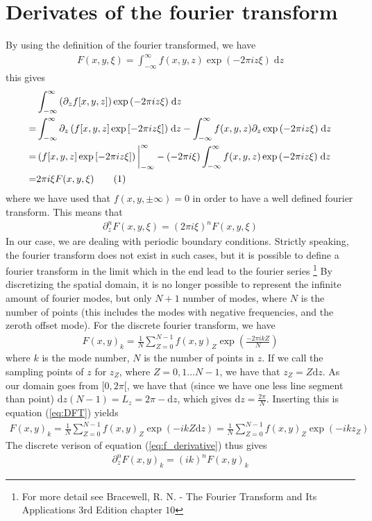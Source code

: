 \documentclass[12pt]{article}
\newcommand{\defi}[4]{\int_{#1}^{#2} {#3} \; \text{d} {#4}} %
\def\L{\left}
\def\R{\right}
\newcommand\numberthis{\addtocounter{equation}{1}\tag{\theequation}}
\begin{document}
\section{Derivates of the fourier transform}
\label{sec:deriv_of_FT}
By using the definition of the fourier transformed, we have
%
\begin{align*}
    F(x,y,\xi) = \defi{-\infty}{\infty}{f(x,y,z)\exp\L(-2\pi iz\xi\R)}{z}
\end{align*}
%
this gives
%
\begin{align*}
    &\defi{-\infty}{\infty}{\L(\partial_zf[x,y,z]\R)\exp\L(-2\pi iz\xi\R)}{z}\\
%
    =& \defi{-\infty}{\infty}{\partial_z\L(f[x,y,z]\exp\L[-2\pi iz\xi\R]\R)}{z}
     - \defi{-\infty}{\infty}{f(x,y,z)\partial_z\exp\L(-2\pi iz\xi\R)}{z}\\
%
    =& \L(f[x,y,z]\exp\L[-2\pi iz\xi\R]\R)\bigg|_{-\infty}^{\infty}
     - \L(-2\pi i\xi\R)\defi{-\infty}{\infty}{f(x,y,z)\exp\L(-2\pi iz\xi\R)}{z}\\
%
    =& 2\pi i\xi F(x,y,\xi)
    \numberthis
    \label{eq:f_derivative}
\end{align*}
%
where we have used that $f(x,y,\pm\infty)=0$ in order to have a well defined
fourier transform. This means that
%
\begin{align*}
    \partial_z^n F(x,y,\xi) = (2\pi i \xi)^n F(x,y,\xi)
\end{align*}
%
In our case, we are dealing with periodic boundary conditions. Strictly
speaking, the fourier transform does not exist in such cases, but it is
possible to define a fourier transform in the limit which in the end lead to
the fourier series%
\footnote{For more detail see Bracewell, R. N. - The Fourier Transform and Its
Applications 3rd Edition chapter $10$}%
%
By discretizing the spatial domain, it is no longer possible to represent the
infinite amount of fourier modes, but only $N+1$ number of modes, where $N$ is
the number of points (this includes the modes with negative frequencies, and
the zeroth offset mode). For the discrete fourier transform, we have
%
\begin{align}
    F(x,y)_{k} =
    \frac{1}{N}\sum_{Z=0}^{N-1}f(x,y)_{Z}\exp\L(\frac{-2\pi i k Z}{N}\R)
    \label{eq:DFT}
\end{align}
%
where $k$ is the mode number, $N$ is the number of points in $z$. If we call
the sampling points of $z$ for $z_Z$, where $Z = 0, 1 \ldots N-1$, we have
that $z_Z = Z \text{d}z$. As our domain goes from $[0, 2\pi[$, we have that
(since we have one less line segment than point) $\text{d}z (N-1) = L_z
= 2\pi - \text{d}z$, which gives $\text{d}z = \frac{2\pi}{N}$. Inserting this
is equation (\ref{eq:DFT}) yields
%
\begin{align*}
    F(x,y)_{k}
    = \frac{1}{N}\sum_{Z=0}^{N-1}f(x,y)_{Z}\exp\L( - i k Z\text{d}z\R)
    = \frac{1}{N}\sum_{Z=0}^{N-1}f(x,y)_{Z}\exp\L( - i k z_Z\R)
\end{align*}
%
The discrete verison of equation (\ref{eq:f_derivative}) thus gives
%
\begin{align*}
    \partial_z^n F(x,y)_k = (i k)^n F(x,y)_k
\end{align*}
%
\end{document}
